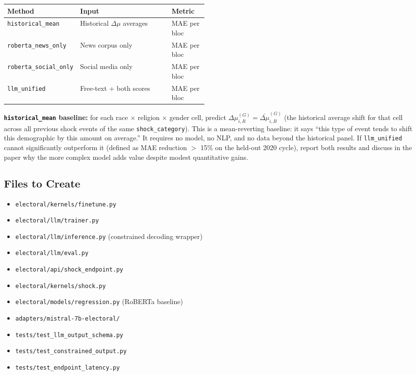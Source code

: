 \documentclass[11pt]{article}
\begin{document}
\begin{center}
\begin{tabularx}{\linewidth}{p{0.30\linewidth}Xp{0.18\linewidth}}
\toprule
\textbf{Method} & \textbf{Input} & \textbf{Metric} \\
\midrule
\texttt{historical\_mean}      & Historical $\Delta\mu$ averages & MAE per bloc \\
\texttt{roberta\_news\_only}   & News corpus only                & MAE per bloc \\
\texttt{roberta\_social\_only} & Social media only               & MAE per bloc \\
\texttt{llm\_unified}          & Free-text + both scores         & MAE per bloc \\
\bottomrule
\end{tabularx}
\end{center}

\noindent\textbf{\texttt{historical\_mean} baseline:} for each race $\times$ religion
$\times$ gender cell, predict $\Delta\mu_{i,R}^{(G)} = \bar{\Delta\mu}_{i,R}^{(G)}$
(the historical average shift for that cell across all previous shock events of the
same \texttt{shock\_category}). This is a mean-reverting baseline: it says ``this
type of event tends to shift this demographic by this amount on average.'' It
requires no model, no NLP, and no data beyond the historical panel. If
\texttt{llm\_unified} cannot significantly outperform it (defined as MAE reduction
$>$ 15\% on the held-out 2020 cycle), report both results and discuss in the paper
why the more complex model adds value despite modest quantitative gains.

\subsection*{Files to Create}

\begin{itemize}[leftmargin=1.6em, itemsep=2pt]
  \item \texttt{electoral/kernels/finetune.py}
  \item \texttt{electoral/llm/trainer.py}
  \item \texttt{electoral/llm/inference.py} (constrained decoding wrapper)
  \item \texttt{electoral/llm/eval.py}
  \item \texttt{electoral/api/shock\_endpoint.py}
  \item \texttt{electoral/kernels/shock.py}
  \item \texttt{electoral/models/regression.py} (RoBERTa baseline)
  \item \texttt{adapters/mistral-7b-electoral/}
  \item \texttt{tests/test\_llm\_output\_schema.py}
  \item \texttt{tests/test\_constrained\_output.py}
  \item \texttt{tests/test\_endpoint\_latency.py}
\end{itemize}
\end{document}
